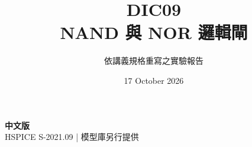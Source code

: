 \documentclass[11pt,a4paper]{article}
\title{\color{accent}DIC09\\[4pt]NAND 與 NOR 邏輯閘}
\author{依講義規格重寫之實驗報告}
\date{17 October 2026}
\begin{document}
\maketitle
\begin{center}\small\textbf{中文版}\\
HSPICE S-2021.09 \quad | \quad 模型庫另行提供
\end{center}


\end{document}
